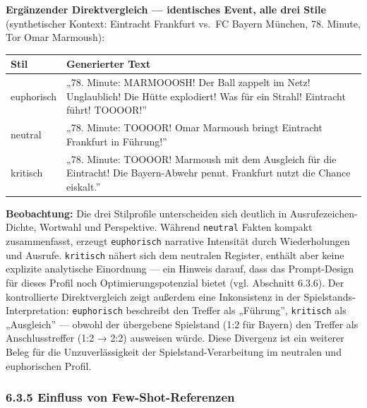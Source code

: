 \textbf{Ergänzender Direktvergleich --- identisches Event, alle drei
Stile} (synthetischer Kontext: Eintracht Frankfurt vs.~FC Bayern
München, 78. Minute, Tor Omar Marmoush):

{\def\LTcaptype{none} %
\begin{longtable}[]{@{}
  >{\raggedright\arraybackslash}p{}
  >{\raggedright\arraybackslash}p{}@{}}
\toprule\noalign{}
\begin{minipage}[b]{\linewidth}\raggedright
Stil
\end{minipage} & \begin{minipage}[b]{\linewidth}\raggedright
Generierter Text
\end{minipage} \\
\midrule\noalign{}
\endhead
\bottomrule\noalign{}
\endlastfoot
euphorisch & „78. Minute: MARMOOOSH! Der Ball zappelt im Netz!
Unglaublich! Die Hütte explodiert! Was für ein Strahl! Eintracht führt!
TOOOOR!'' \\
neutral & „78. Minute: TOOOOR! Omar Marmoush bringt Eintracht Frankfurt
in Führung!'' \\
kritisch & „78. Minute: TOOOOR! Marmoush mit dem Ausgleich für die
Eintracht! Die Bayern-Abwehr pennt. Frankfurt nutzt die Chance
eiskalt.'' \\
\end{longtable}
}

\textbf{Beobachtung:} Die drei Stilprofile unterscheiden sich deutlich
in Ausrufezeichen-Dichte, Wortwahl und Perspektive. Während
\passthrough{\lstinline!neutral!} Fakten kompakt zusammenfasst, erzeugt
\passthrough{\lstinline!euphorisch!} narrative Intensität durch
Wiederholungen und Ausrufe. \passthrough{\lstinline!kritisch!} nähert
sich dem neutralen Register, enthält aber keine explizite analytische
Einordnung --- ein Hinweis darauf, dass das Prompt-Design für dieses
Profil noch Optimierungspotenzial bietet (vgl. Abschnitt 6.3.6). Der
kontrollierte Direktvergleich zeigt außerdem eine Inkonsistenz in der
Spielstands-Interpretation: \passthrough{\lstinline!euphorisch!}
beschreibt den Treffer als „Führung'',
\passthrough{\lstinline!kritisch!} als „Ausgleich'' --- obwohl der
übergebene Spielstand (1:2 für Bayern) den Treffer als Anschlusstreffer
(1:2 → 2:2) ausweisen würde. Diese Divergenz ist ein weiterer Beleg für
die Unzuverlässigkeit der Spielstand-Verarbeitung im neutralen und
euphorischen Profil.

\subsubsection{6.3.5 Einfluss von
Few-Shot-Referenzen}\label{einfluss-von-few-shot-referenzen}

